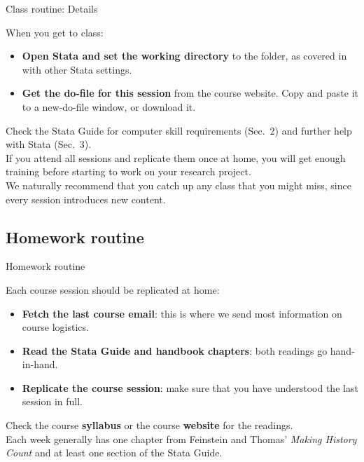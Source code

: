 \documentclass{beamer}
\begin{document}
	\begin{frame}[t]{Class routine: Details}
	
	When you get to class:
	
	\begin{itemize}
		\item \textbf{Open Stata and set the working directory} to the  folder, as covered in  with other Stata settings.
		\item \textbf{Get the do-file for this session} from the course website. Copy and paste it to a new-do-file window, or download it.
	\end{itemize}
	
	Check the Stata Guide for computer skill requirements (Sec.~2) and further help with Stata (Sec.~3).\\[.5em]
	
	If you attend all sessions and replicate them once at home, you will get enough training before starting to work on your research project.\\[.5em]
	
	We naturally recommend that you catch up any class that you might miss, since every session introduces new content.
	\end{frame}
	
	\subsection{Homework routine}
	
	\begin{frame}[t]{Homework routine}

	Each course session should be replicated at home:
	
	\begin{itemize}
		\item \textbf{Fetch the last course email}: this is where we send most information on course logistics.

		\item \textbf{Read the Stata Guide and handbook chapters}: both readings go hand-in-hand.
		
		\item \textbf{Replicate the course session}: make sure that you have understood the last session in full.
	\end{itemize}
	
	Check the course \textbf{syllabus} or the course \textbf{website} for the readings.\\[.5em]
	
	Each week generally has one chapter from Feinstein and Thomas' \textit{Making History Count} and at least one section of the Stata Guide.\\[.5em]
	
	\end{frame}
	
\end{document}
